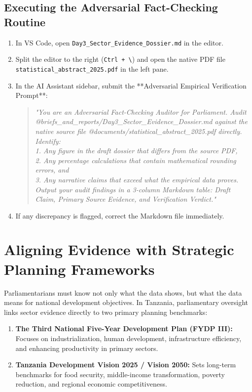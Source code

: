 \documentclass[11pt, a4paper]{report}
\begin{document}
\subsection{Executing the Adversarial Fact-Checking Routine}
\begin{enumerate}[label=\textbf{Step \arabic*:}]
    \item In VS Code, open \texttt{Day3\_Sector\_Evidence\_Dossier.md} in the editor.
    \item Split the editor to the right (\texttt{Ctrl + \textbackslash}) and open the native PDF file \texttt{statistical\_abstract\_2025.pdf} in the left pane.
    \item In the AI Assistant sidebar, submit the **Adversarial Empirical Verification Prompt**:
    \begin{quote}
        \small\textit{"You are an Adversarial Fact-Checking Auditor for Parliament. Audit @briefs\_and\_reports/Day3\_Sector\_Evidence\_Dossier.md against the native source file @documents/statistical\_abstract\_2025.pdf directly. \\
        Identify: \\
        1. Any figure in the draft dossier that differs from the source PDF, \\
        2. Any percentage calculations that contain mathematical rounding errors, and \\
        3. Any narrative claims that exceed what the empirical data proves. \\
        Output your audit findings in a 3-column Markdown table: Draft Claim, Primary Source Evidence, and Verification Verdict."}
    \end{quote}
    \item If any discrepancy is flagged, correct the Markdown file immediately.
\end{enumerate}

\section{Aligning Evidence with Strategic Planning Frameworks}
Parliamentarians must know not only what the data shows, but what the data means for national development objectives. In Tanzania, parliamentary oversight links sector evidence directly to two primary planning benchmarks:
\begin{enumerate}
    \item \textbf{The Third National Five-Year Development Plan (FYDP III):} Focuses on industrialization, human development, infrastructure efficiency, and enhancing productivity in primary sectors.
    \item \textbf{Tanzania Development Vision 2025 / Vision 2050:} Sets long-term benchmarks for food security, middle-income transformation, poverty reduction, and regional economic competitiveness.
\end{enumerate}
\end{document}
